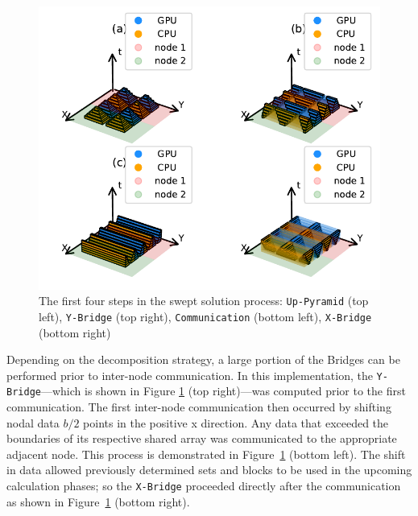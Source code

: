 \documentclass[preprints,article,accept,moreauthors,pdftex]{Definitions/mdpi}
\def\Up{\texttt{Up-Pyramid}}
\def\Xb{\texttt{X-Bridge}}
\def\Yb{\texttt{Y-Bridge}}
\newcommand\fs{0.7}
\begin{document}
\begin{figure}[H]
    
    \begin{center}
        \includegraphics[scale=\fs, trim={1cm 0.6cm 0.5cm 0.2cm},clip]{figs/SubsPlot1.pdf}
    \end{center}
    \caption{The first four steps in the swept solution process: \Up{} (top left), \Yb{} (top right), \texttt{Communication} (bottom left), \Xb{} (bottom right)}
    \label{fig:MainOne}
\end{figure}




\par
Depending on the decomposition strategy, a large portion of the Bridges can be performed prior to inter-node communication. In this implementation, the \Yb{}---which is shown in Figure \ref{fig:MainOne} (top right)---was computed prior to the first communication. The first inter-node communication then occurred by shifting nodal data $b/2$ points in the positive x direction. Any data that exceeded the boundaries of its respective shared array was communicated to the appropriate adjacent node. This process is demonstrated in Figure~\ref{fig:MainOne} (bottom left). The shift in data allowed previously determined sets and blocks to be used in the upcoming calculation phases; so the \Xb{} proceeded directly after the communication as shown in Figure~\ref{fig:MainOne} (bottom right).

% 
\end{document}
